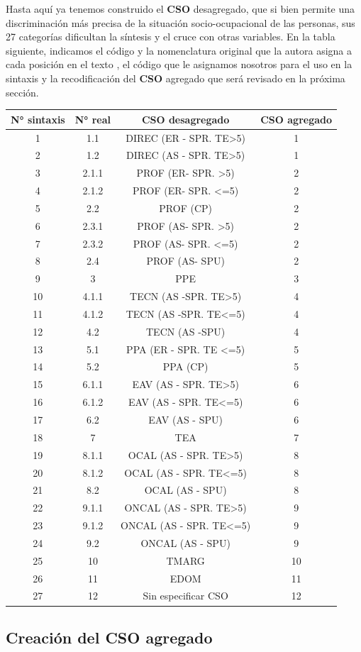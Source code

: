 \documentclass[
]{book}
\begin{document}
Hasta aquí ya tenemos construido el \textbf{CSO} desagregado, que si bien permite una discriminación más precisa de la situación socio-ocupacional de las personas, sus 27 categorías dificultan la síntesis y el cruce con otras variables. En la tabla siguiente, indicamos el código y la nomenclatura original que la autora asigna a cada posición en el texto \citep[pp.~226]{Torrado1998d}, el código que le asignamos nosotros para el uso en la sintaxis y la recodificación del \textbf{CSO} agregado que será revisado en la próxima sección.

\begin{longtable}[]{@{}cccc@{}}
\toprule
N° sintaxis & N° real & CSO desagregado & CSO agregado\tabularnewline
\midrule
\endhead
1 & 1.1 & DIREC (ER - SPR. TE\textgreater5) & 1\tabularnewline
2 & 1.2 & DIREC (AS - SPR. TE\textgreater5) & 1\tabularnewline
3 & 2.1.1 & PROF (ER- SPR. \textgreater5) & 2\tabularnewline
4 & 2.1.2 & PROF (ER- SPR. \textless=5) & 2\tabularnewline
5 & 2.2 & PROF (CP) & 2\tabularnewline
6 & 2.3.1 & PROF (AS- SPR. \textgreater5) & 2\tabularnewline
7 & 2.3.2 & PROF (AS- SPR. \textless=5) & 2\tabularnewline
8 & 2.4 & PROF (AS- SPU) & 2\tabularnewline
9 & 3 & PPE & 3\tabularnewline
10 & 4.1.1 & TECN (AS -SPR. TE\textgreater5) & 4\tabularnewline
11 & 4.1.2 & TECN (AS -SPR. TE\textless=5) & 4\tabularnewline
12 & 4.2 & TECN (AS -SPU) & 4\tabularnewline
13 & 5.1 & PPA (ER - SPR. TE \textless=5) & 5\tabularnewline
14 & 5.2 & PPA (CP) & 5\tabularnewline
15 & 6.1.1 & EAV (AS - SPR. TE\textgreater5) & 6\tabularnewline
16 & 6.1.2 & EAV (AS - SPR. TE\textless=5) & 6\tabularnewline
17 & 6.2 & EAV (AS - SPU) & 6\tabularnewline
18 & 7 & TEA & 7\tabularnewline
19 & 8.1.1 & OCAL (AS - SPR. TE\textgreater5) & 8\tabularnewline
20 & 8.1.2 & OCAL (AS - SPR. TE\textless=5) & 8\tabularnewline
21 & 8.2 & OCAL (AS - SPU) & 8\tabularnewline
22 & 9.1.1 & ONCAL (AS - SPR. TE\textgreater5) & 9\tabularnewline
23 & 9.1.2 & ONCAL (AS - SPR. TE\textless=5) & 9\tabularnewline
24 & 9.2 & ONCAL (AS - SPU) & 9\tabularnewline
25 & 10 & TMARG & 10\tabularnewline
26 & 11 & EDOM & 11\tabularnewline
27 & 12 & Sin especificar CSO & 12\tabularnewline
\bottomrule
\end{longtable}

\hypertarget{creaciuxf3n-del-cso-agregado}{%
\subsection{Creación del CSO agregado}\label{creaciuxf3n-del-cso-agregado}}
\end{document}
